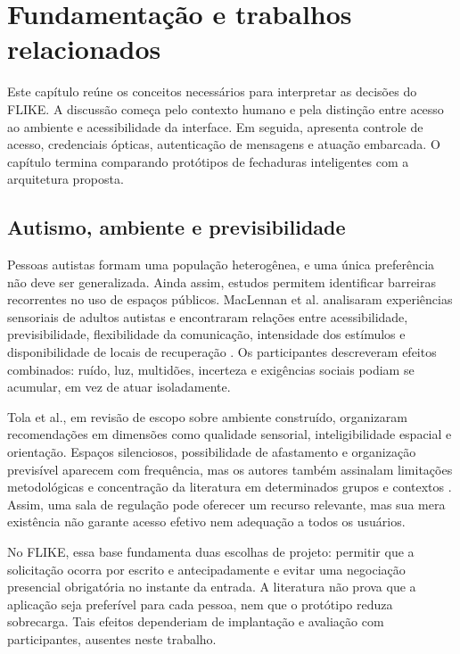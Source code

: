 \chapter{Fundamentação e trabalhos relacionados} \label{cap:conceitos}

Este capítulo reúne os conceitos necessários para interpretar as decisões do FLIKE. A discussão começa pelo contexto humano e pela distinção entre acesso ao ambiente e acessibilidade da interface. Em seguida, apresenta controle de acesso, credenciais ópticas, autenticação de mensagens e atuação embarcada. O capítulo termina comparando protótipos de fechaduras inteligentes com a arquitetura proposta.

\section{Autismo, ambiente e previsibilidade}

Pessoas autistas formam uma população heterogênea, e uma única preferência não deve ser generalizada. Ainda assim, estudos permitem identificar barreiras recorrentes no uso de espaços públicos. MacLennan et al. analisaram experiências sensoriais de adultos autistas e encontraram relações entre acessibilidade, previsibilidade, flexibilidade da comunicação, intensidade dos estímulos e disponibilidade de locais de recuperação \cite{maclennan2023sensory}. Os participantes descreveram efeitos combinados: ruído, luz, multidões, incerteza e exigências sociais podiam se acumular, em vez de atuar isoladamente.

Tola et al., em revisão de escopo sobre ambiente construído, organizaram recomendações em dimensões como qualidade sensorial, inteligibilidade espacial e orientação. Espaços silenciosos, possibilidade de afastamento e organização previsível aparecem com frequência, mas os autores também assinalam limitações metodológicas e concentração da literatura em determinados grupos e contextos \cite{tola2021builtenvironment}. Assim, uma sala de regulação pode oferecer um recurso relevante, mas sua mera existência não garante acesso efetivo nem adequação a todos os usuários.

No FLIKE, essa base fundamenta duas escolhas de projeto: permitir que a solicitação ocorra por escrito e antecipadamente e evitar uma negociação presencial obrigatória no instante da entrada. A literatura não prova que a aplicação seja preferível para cada pessoa, nem que o protótipo reduza sobrecarga. Tais efeitos dependeriam de implantação e avaliação com participantes, ausentes neste trabalho.

